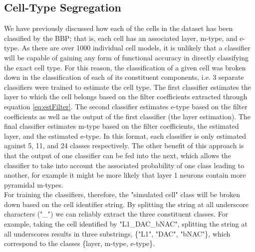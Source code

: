 \subsection{Cell-Type Segregation}
We have previously discussed how each of the cells in the dataset has been classified by the BBP; that is, each cell has an associated layer, m-type, and e-type. As there are over 1000 individual cell models, it is unlikely that a classifier will be capable of gaining any form of functional accuracy in directly classifying the exact cell type. For this reason, the classification of a given cell was broken down in the classification of each of its constituent components, i.e. 3 separate classifiers were trained to estimate the cell type. The first classifier estimates the layer to which the cell belongs based on the filter coefficients extracted through equation \ref{eq:estFilter}. The second classifier estimates e-type based on the filter coefficients as well as the output of the first classifier (the layer estimation). The final classifier estimates m-type based on the filter coefficients, the estimated layer, and the estimated e-type. In this format, each classifier is only estimated against 5, 11, and 24 classes respectively. The other benefit of this approach is that the output of one classifier can be fed into the next, which allows the classifier to take into account the associated probability of one class leading to another, for example it might be more likely that layer 1 neurons contain more pyramidal m-types.\\
For training the classifiers, therefore, the "simulated cell" class will be broken down based on the cell identifier string. By splitting the string at all underscore characters ("\_") we can reliably extract the three constituent classes. For example, taking the cell identified by "L1\_DAC\_bNAC", splitting the string at all underscores results in three substrings, \{"L1", "DAC", "bNAC"\}, which correspond to the classes \{layer, m-type, e-type\}.

